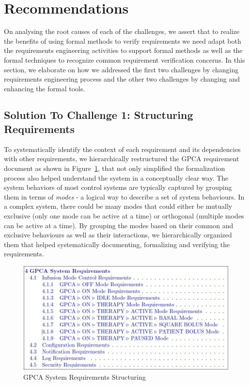 \section{Recommendations}
\label{sec:recommendations}

On analysing the root causes of each of the challenges, we assert that to realize the benefits of using formal methods to verify requirements we need adapt both the requirements engineering activities to support formal methods as well as the formal techniques to recognize common requirement verification concerns. In this section, we elaborate on how we addressed the first two challenges by changing requirements engineering process and the other two challenges by changing and enhancing the formal tools.

\subsection {Solution To Challenge 1: Structuring Requirements}

To systematically identify the context of each requirement and its dependencies with other requirements, we hierarchically restructured the GPCA requirement document as shown in Figure~\ref{fig:gpca-requirements}, that not only simplified the formalization process also helped understand the system in a conceptually clear way. The system behaviors of most control systems are typically captured by grouping them in terms of \emph{modes} - a logical way to describe a set of system behaviours. In a complex system, there could be many modes that could either be mutually exclusive (only one mode can be active at a time) or orthogonal (multiple modes can be active at a time). By grouping the modes based on their common and exclusive behaviours as well as their interactions, we hierarchically organized them that helped systematically documenting, formalizing and verifying the requirements.

 \begin{figure}[h!]
    \centering
    \includegraphics[width=\columnwidth]{images/structuring.jpg}
    \caption{GPCA System Requirements Structuring}
    \label{fig:gpca-requirements}
 \end{figure}

